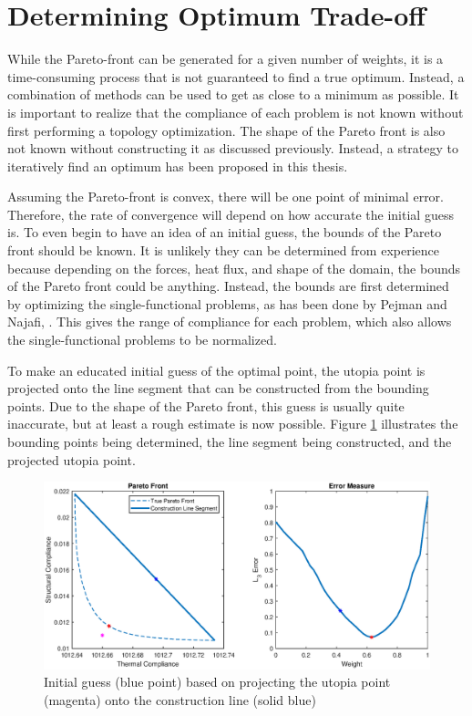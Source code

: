 \section{Determining Optimum Trade-off}
While the Pareto-front can be generated for a given number of weights, it is a time-consuming process that is not guaranteed to find a true optimum. Instead, a combination of methods can be used to get as close to a minimum as possible. It is important to realize that the compliance of each problem is not known without first performing a topology optimization. The shape of the Pareto front is also not known without constructing it as discussed previously. Instead, a strategy to iteratively find an optimum has been proposed in this thesis.

Assuming the Pareto-front is convex, there will be one point of minimal error. Therefore, the rate of convergence will depend on how accurate the initial guess is. To even begin to have an idea of an initial guess, the bounds of the Pareto front should be known. It is unlikely they can be determined from experience because depending on the forces, heat flux, and shape of the domain, the bounds of the Pareto front could be anything. Instead, the bounds are first determined by optimizing the single-functional problems, as has been done by Pejman and Najafi, \cite{Pejman_Najafi_2023}. This gives the range of compliance for each problem, which also allows the single-functional problems to be normalized. 

To make an educated initial guess of the optimal point, the utopia point is projected onto the line segment that can be constructed from the bounding points. Due to the shape of the Pareto front, this guess is usually quite inaccurate, but at least a rough estimate is now possible. Figure \ref{fig:optimal_point_construction} illustrates the bounding points being determined, the line segment being constructed, and the projected utopia point.
\begin{figure}[ht]
    \centering
    \includegraphics[width=0.85\linewidth]{figures/chapter_5/OptimalPointConstruction.eps}
    \caption{Initial guess (blue point) based on projecting the utopia point (magenta) onto the construction line (solid blue)}
    \label{fig:optimal_point_construction}
\end{figure}

